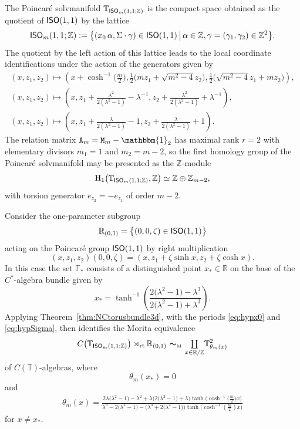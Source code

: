 \documentclass[10pt,a4paper]{amsart}
\numberwithin{equation}{section}
\newcommand{\Z}{\zed}
\newcommand{\F}{\mathbb{F}}
\newcommand{\mbf}[1]{{\boldsymbol {#1} }}
\newcommand{\unit}{\mathbbm{1}} 			%
\newcommand{\ISO}{{\sf ISO}}
\newcommand{\rt}{{\rm rt}}
\newcommand{\mcoprod}{\mbox{$\coprod\limits_{x\in\R/\Z}$}}
\newcommand{\R}{\real}
\newcommand{\zed}{{\mathbb Z}} %
\newcommand{\real}{{\mathbb R}} %
\newcommand{\torus}{{\mathbb T}} %
\begin{document}
The Poincar\'e
solvmanifold $\torus_{\ISO_m(1,1;\Z)}$ is the compact space
obtained as the quotient of $\ISO(1,1)$ by the lattice
\[
\ISO_m(1,1;\Z) := \big\{(x_0\,\alpha,\Sigma\cdot\gamma)\in\ISO(1,1) \, \big| \,
\alpha\in\Z , \gamma=(\gamma_1,\gamma_2)\in\Z^2\big\} .
\]
The quotient by the left action of this lattice leads to the local
coordinate identifications under the action of the generators given by
\begin{gather*}
(x,z_1,z_2) \longmapsto
\left(x+\cosh^{-1}\big(\tfrac m2\big),\tfrac12\big(mz_1+\sqrt{m^2-4}z_2\big),\tfrac12\big(\sqrt{m^2-4}z_1+mz_2\big) \right) , \\
(x,z_1,z_2) \longmapsto \left(x , z_1+\tfrac{\lambda^2}{2 (\lambda^2-1)}-\lambda^{-1} , z_2+\tfrac{\lambda^2}{2(\lambda^2-1)}+\lambda^{-1}\right) , \nonumber
 \\
(x,z_1,z_2) \longmapsto \left(x, z_1+\tfrac\lambda{2(\lambda^2-1)}-1, z_2+\tfrac\lambda{2(\lambda^2-1)}+1\right).
\end{gather*}
The relation matrix ${\tt A}_m = {\tt M}_m-\unit_2$ has maximal rank $r=2$ with elementary divisors $m_1=1$ and
$m_2=m-2$, so the first homology group of the Poincar\'e solvmanifold may be
presented as the $\Z$-module
\[
{\rm H}_1\big(\torus_{\ISO_m(1,1;\Z)},\Z\big)\simeq\Z\oplus\Z_{m-2} ,
\]
with torsion generator $e_{z_2}=-e_{z_1}$ of order $m-2$.

Consider the one-parameter subgroup
\[
\real_{(0,1)} = \big\{(0,0,\zeta)\in\ISO(1,1)\big\}
\]
acting on the Poincar\'e group $\ISO(1,1)$ by right multiplication
\[
(x,z_1,z_2) (0,0,\zeta) = (x,z_1+\zeta\sinh x,z_2+\zeta\cosh x) .
\]
In this case the set $\F_*$ consists of a distinguished point $x_*\in\R$ on the base of the
$C^*$-algebra bundle given by
\[
x_*=\tanh^{-1}\left(\frac{2 \big(\lambda^2-1\big)-\lambda^3}{2 \big(\lambda^2-1\big)+\lambda^3}\right).
\]
Applying
Theorem~\ref{thm:NCtorusbundle3d}, with the periods
\eqref{eq:hypx0} and \eqref{eq:hypSigma}, then identifies the
Morita equivalence
\[
C\big(\torus_{\ISO_m(1,1;\Z)}\big)\rtimes_\rt\real_{(0,1)} \ \mbf\sim_{\text{\tiny M}} \
\mcoprod \torus_{\theta_m(x)}^2
\]
of $C(\torus)$-algebras, where
\[
\theta_m(x_*)=0
\]
and
\begin{gather}\label{eq:thetamxhyp}
\theta_m(x) =
\frac{2 \lambda \big(\lambda^2-1\big)-\lambda^2+\lambda
 \big(2\big(\lambda^2-1\big)+\lambda\big)\tanh\big(\cosh^{-1}\big(\frac
 m2\big) x\big)}{\lambda^3-2 \big(\lambda^2-1\big) - \big(\lambda^3+2 \big(\lambda^2-1\big)\big)\tanh\big(\cosh^{-1}(\frac
 m2) x\big)}
\end{gather}
for $x\neq x_*$.
\end{document}
